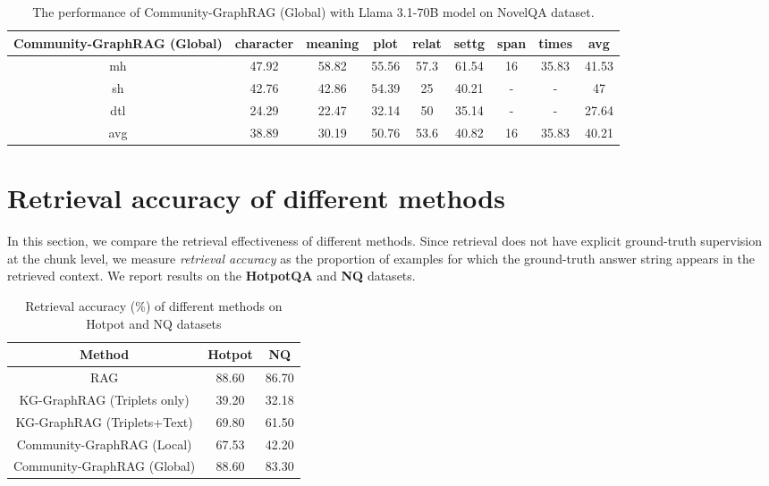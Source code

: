 \begin{table}[!htb]
\caption{The performance of Community-GraphRAG (Global) with Llama 3.1-70B model on NovelQA dataset.}
\label{app:tab:global-70b}
\centering
\begin{tabular}{c|cccccccc}
\hline
Community-GraphRAG (Global) & character & meaning & plot  & relat & settg & span & times & avg   \\ \hline
mh     & 47.92     & 58.82   & 55.56 & 57.3  & 61.54 & 16   & 35.83 & 41.53 \\
sh     & 42.76     & 42.86   & 54.39 & 25    & 40.21 & -    & -     & 47    \\
dtl    & 24.29     & 22.47   & 32.14 & 50    & 35.14 & -    & -     & 27.64 \\
avg    & 38.89     & 30.19   & 50.76 & 53.6  & 40.82 & 16   & 35.83 & 40.21 \\ \hline
\end{tabular}
\end{table}

\section{Retrieval accuracy of different methods}
\label{app:sec:retrieve}

In this section, we compare the retrieval effectiveness of different methods. Since retrieval does not have explicit ground-truth supervision at the chunk level, we measure \emph{retrieval accuracy} as the proportion of examples for which the ground-truth answer string appears in the retrieved context. We report results on the \textbf{HotpotQA} and \textbf{NQ} datasets.

\begin{table}[!htb]
\centering
\caption{Retrieval accuracy (\%) of different methods on Hotpot and NQ datasets}
\label{app:tab:retrieve}
\begin{tabular}{c|cc}
\hline
Method                      & Hotpot & NQ     \\ \hline
RAG                         & 88.60  & 86.70  \\
KG-GraphRAG (Triplets only)  & 39.20  & 32.18 \\
KG-GraphRAG (Triplets+Text)  & 69.80 & 61.50 \\
Community-GraphRAG (Local)  & 67.53 & 42.20 \\
Community-GraphRAG (Global) & 88.60 & 83.30 \\ \hline

\end{tabular}
\end{table}

